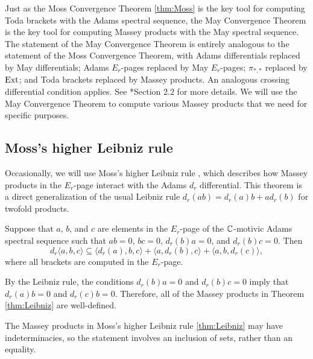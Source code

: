 \begin{remark}
\label{rem:May-convergence}
Just as the Moss Convergence Theorem \ref{thm:Moss} is the key
tool for computing Toda brackets with the Adams spectral sequence,
the May Convergence Theorem is the key tool for computing
Massey products with the May spectral sequence.  The statement of
the May Convergence Theorem is entirely analogous to the
statement of the Moss Convergence Theorem, with 
Adams differentials replaced by  May differentials;
 Adams $E_r$-pages replaced by 
May $E_r$-pages;  $\pi_{*,*}$ replaced by
 $\operatorname{Ext}$; and  Toda brackets replaced
by Massey products.  An analogous crossing differential
condition applies.  See \cite{Isaksen14c}*{Section 2.2} \cite{May69}
for more details.  We will use the May Convergence Theorem to
compute various Massey products that we need for specific purposes.
\end{remark}


\subsection{Moss's higher Leibniz rule}
\label{subsctn:Leibniz}

Occasionally, we will use Moss's higher Leibniz rule \cite{Moss70}, 
which describes how Massey products in the $E_r$-page interact with
the Adams $d_r$ differential.  This theorem is a 
direct generalization of the usual Leibniz rule
$d_r(ab) = d_r(a) b + a d_r(b)$ for twofold products.

\begin{thm}
\label{thm:Leibniz}
\cite{Moss70}
Suppose that $a$, $b$, and $c$ are elements in the $E_r$-page 
of the $\mathbb{C}$-motivic Adams spectral sequence such that $ab=0$, $bc=0$,
$d_r(b) a = 0$, and $d_r(b) c = 0$.
Then
$$d_r \langle a, b, c \rangle \subseteq \langle d_r(a), b, c \rangle + \langle a, d_r(b), c \rangle + \langle a, b, d_r(c) \rangle,$$	
where all brackets are computed in the $E_r$-page.
\end{thm}

\begin{remark}
By the Leibniz rule, 
the conditions $d_r (b) a = 0$ and $d_r (b) c =0$ imply that 
$d_r (a) b = 0$ and $d_r (c) b =0$. Therefore, all of the Massey
products in Theorem \ref{thm:Leibniz} are well-defined.
\end{remark}

\begin{remark}
The Massey products in Moss's higher Leibniz rule \ref{thm:Leibniz} may have indeterminacies,
so the statement involves an inclusion of sets, rather than an equality.
\end{remark}

